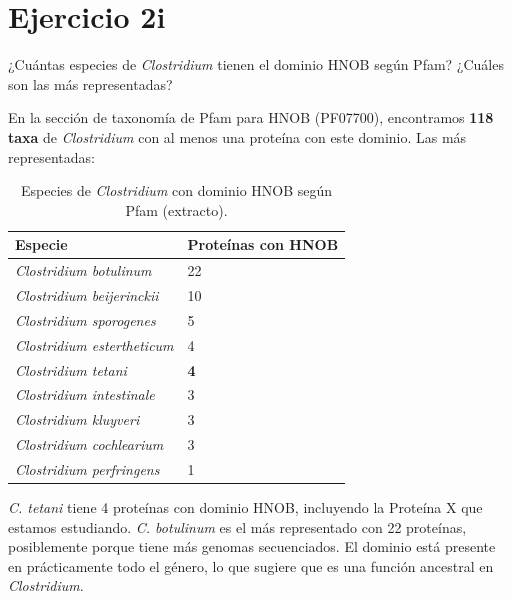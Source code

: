 \section{Ejercicio 2i}

\begin{consigna}
¿Cuántas especies de \textit{Clostridium} tienen el dominio HNOB según Pfam? ¿Cuáles son las
más representadas?
\end{consigna}

En la sección de taxonomía de Pfam para HNOB (PF07700), encontramos \textbf{118 taxa} de
\textit{Clostridium} con al menos una proteína con este dominio. Las más representadas:

\begin{table}[H]
\centering
\footnotesize
\begin{tabular}{lP{3cm}}
\toprule
Especie & Proteínas con HNOB \\
\midrule
\textit{Clostridium botulinum}      & 22 \\
\textit{Clostridium beijerinckii}   & 10 \\
\textit{Clostridium sporogenes}     &  5 \\
\textit{Clostridium estertheticum}  &  4 \\
\textit{Clostridium tetani}         &  \textbf{4} \\
\textit{Clostridium intestinale}    &  3 \\
\textit{Clostridium kluyveri}       &  3 \\
\textit{Clostridium cochlearium}    &  3 \\
\textit{Clostridium perfringens}    &  1 \\
\bottomrule
\end{tabular}
\caption{Especies de \textit{Clostridium} con dominio HNOB según Pfam (extracto).}
\end{table}

\textit{C. tetani} tiene 4 proteínas con dominio HNOB, incluyendo la Proteína X que estamos
estudiando. \textit{C. botulinum} es el más representado con 22 proteínas, posiblemente porque
tiene más genomas secuenciados. El dominio está presente en prácticamente todo el género, lo
que sugiere que es una función ancestral en \textit{Clostridium}.
